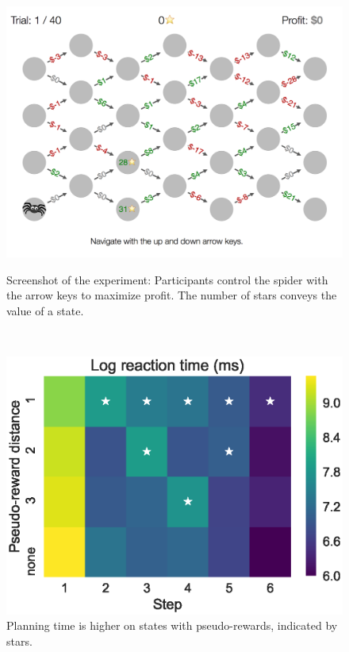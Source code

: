 \documentclass[10pt,letterpaper]{article}
\begin{document}
\begin{figure}[t!]
\begin{minipage}{.47\textwidth}
    \includegraphics[width=\linewidth]{figs/paradigm.png}
    \caption{Screenshot of the experiment: Participants control the spider with the arrow keys to maximize profit. The number of stars conveys the value of a state.}
    \label{fig:paradigm}
\end{minipage}%
\begin{minipage}{.1\textwidth}
$\;\;$
\end{minipage}
\begin{minipage}{.455\textwidth}
  \includegraphics[width=\linewidth]{figs/plan_time.eps}
  \caption{Planning time is higher on states with pseudo-rewards, indicated by stars.}
  \label{fig:plan-time}
\end{minipage}
\end{figure}
\end{document}
